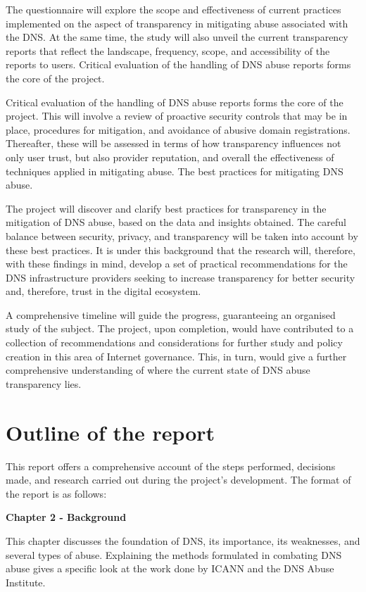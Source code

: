 The questionnaire will explore the scope and effectiveness of current practices implemented on the aspect of transparency in mitigating abuse associated with the DNS. At the same time, the study will also unveil the current transparency reports that reflect the landscape, frequency, scope, and accessibility of the reports to users. Critical evaluation of the handling of DNS abuse reports forms the core of the project.

Critical evaluation of the handling of DNS abuse reports forms the core of the project. This will involve a review of proactive security controls that may be in place, procedures for mitigation, and avoidance of abusive domain registrations. Thereafter, these will be assessed in terms of how transparency influences not only user trust, but also provider reputation, and overall the effectiveness of techniques applied in mitigating abuse. The best practices for mitigating DNS abuse.

The project will discover and clarify best practices for transparency in the mitigation of DNS abuse, based on the data and insights obtained. The careful balance between security, privacy, and transparency will be taken into account by these best practices. It is under this background that the research will, therefore, with these findings in mind, develop a set of practical recommendations for the DNS infrastructure providers seeking to increase transparency for better security and, therefore, trust in the digital ecosystem.

A comprehensive timeline will guide the progress, guaranteeing an organised study of the subject. The project, upon completion, would have contributed to a collection of recommendations and considerations for further study and policy creation in this area of Internet governance. This, in turn, would give a further comprehensive understanding of where the current state of DNS abuse transparency lies.

\section{Outline of the report}

This report offers a comprehensive account of the steps performed, decisions made, and research carried out during the project's development. The format of the report is as follows:

\textbf{Chapter 2 - Background }

This chapter discusses the foundation of DNS, its importance, its weaknesses, and several types of abuse. Explaining the methods formulated in combating DNS abuse gives a specific look at the work done by ICANN and the DNS Abuse Institute.


